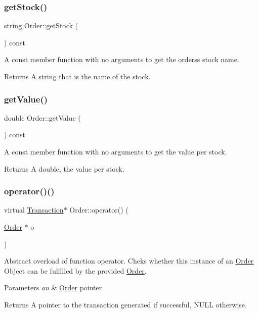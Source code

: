 \subsubsection{\texorpdfstring{get\+Stock()}{getStock()}}
{\footnotesize\ttfamily string Order\+::get\+Stock (\begin{DoxyParamCaption}{ }\end{DoxyParamCaption}) const}

A const member function with no arguments to get the orders\textquotesingle{}s stock name. \begin{DoxyReturn}{Returns}
A string that is the name of the stock. 
\end{DoxyReturn}
\hypertarget{class_order_a7e93f84ff8b0468aef7e7ee23ea1979c}{}\label{class_order_a7e93f84ff8b0468aef7e7ee23ea1979c} 
\subsubsection{\texorpdfstring{get\+Value()}{getValue()}}
{\footnotesize\ttfamily double Order\+::get\+Value (\begin{DoxyParamCaption}{ }\end{DoxyParamCaption}) const}

A const member function with no arguments to get the value per stock. \begin{DoxyReturn}{Returns}
A double, the value per stock. 
\end{DoxyReturn}
\hypertarget{class_order_a85d5de18c8664085619e3a5c74d47a25}{}\label{class_order_a85d5de18c8664085619e3a5c74d47a25} 
\subsubsection{\texorpdfstring{operator()()}{operator()()}}
{\footnotesize\ttfamily virtual \hyperlink{class_transaction}{Transaction}$\ast$ Order\+::operator() (\begin{DoxyParamCaption}\item[{\hyperlink{class_order}{Order} $\ast$}]{o }\end{DoxyParamCaption})\hspace{0.3cm}{\ttfamily [pure virtual]}}

Abstract overload of function operator. Cheks whether this instance of an \hyperlink{class_order}{Order} Object can be fulfilled by the provided \hyperlink{class_order}{Order}. 
\begin{DoxyParams}{Parameters}
{\em an} & \hyperlink{class_order}{Order} pointer \\
\hline
\end{DoxyParams}
\begin{DoxyReturn}{Returns}
A pointer to the transaction generated if successful, N\+U\+LL otherwise. 
\end{DoxyReturn}



